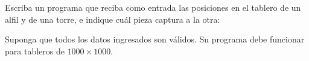 Escriba un programa que reciba como entrada
las posiciones en el tablero de un alfil y de una torre,
e indique cuál pieza captura a la otra:

\begin{minipage}[t]{.28\textwidth}
  
\end{minipage}
\hfil
\begin{minipage}[t]{.28\textwidth}
  
\end{minipage}
\hfil
\begin{minipage}[t]{.28\textwidth}
  
\end{minipage}

Suponga que todos los datos ingresados son válidos.
Su programa debe funcionar para tableros de \(1000\times 1000\).

